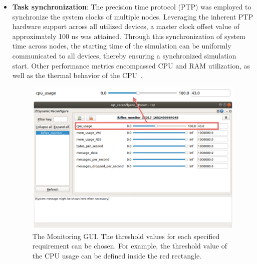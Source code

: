 \begin{itemize}
    \item \textbf{Task synchronization}: 
    The precision time protocol (PTP) was employed to synchronize the system clocks of multiple nodes. Leveraging the inherent PTP hardware support across all utilized devices, a master clock offset value of approximately 100 ns was attained. Through this synchronization of system time across nodes, the starting time of the simulation can
    be uniformly communicated to all devices, thereby ensuring a synchronized simulation start. Other performance metrics encompassed CPU and RAM utilization, as well as the thermal behavior of the CPU~\cite{correll2005design,askaripoor2023designer}.

      \begin{figure}[ht]
    \centering
    \includegraphics[width=0.95\columnwidth]{figures/GUI_monitoring.pdf}
    \caption{The Monitoring GUI. The threshold values for each specified requirement can be chosen. For example, the threshold value of the CPU usage can be defined inside the red rectangle.}
    \label{fig78}
    \end{figure}
    

\end{itemize}
